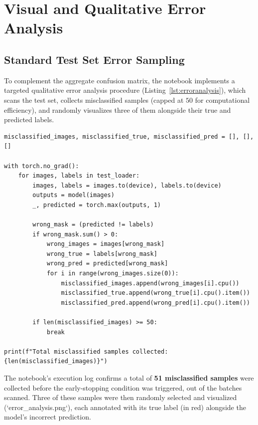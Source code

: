 \documentclass[12pt,a4paper]{report}
\begin{document}
\chapter{Visual and Qualitative Error Analysis}

\section{Standard Test Set Error Sampling}
To complement the aggregate confusion matrix, the notebook implements a targeted qualitative error analysis procedure (Listing~\ref{lst:erroranalysis}), which scans the test set, collects misclassified samples (capped at $50$ for computational efficiency), and randomly visualizes three of them alongside their true and predicted labels.

\begin{lstlisting}[caption={Visual error analysis procedure}, label={lst:erroranalysis}]
misclassified_images, misclassified_true, misclassified_pred = [], [], []

with torch.no_grad():
    for images, labels in test_loader:
        images, labels = images.to(device), labels.to(device)
        outputs = model(images)
        _, predicted = torch.max(outputs, 1)

        wrong_mask = (predicted != labels)
        if wrong_mask.sum() > 0:
            wrong_images = images[wrong_mask]
            wrong_true = labels[wrong_mask]
            wrong_pred = predicted[wrong_mask]
            for i in range(wrong_images.size(0)):
                misclassified_images.append(wrong_images[i].cpu())
                misclassified_true.append(wrong_true[i].cpu().item())
                misclassified_pred.append(wrong_pred[i].cpu().item())

        if len(misclassified_images) >= 50:
            break

print(f"Total misclassified samples collected: {len(misclassified_images)}")
\end{lstlisting}

The notebook's execution log confirms a total of \textbf{51 misclassified samples} were collected before the early-stopping condition was triggered, out of the batches scanned. Three of these samples were then randomly selected and visualized (`error\_analysis.png`), each annotated with its true label (in red) alongside the model's incorrect prediction.
\end{document}
